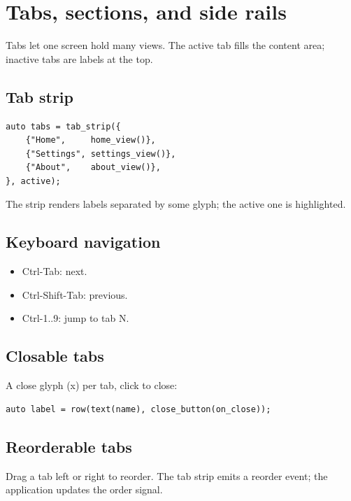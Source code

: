 \chapter{Tabs, sections, and side rails}
\label{ch:tabs}

\begin{aside}
Tabs let one screen hold many views. The active tab fills the
content area; inactive tabs are labels at the top.
\end{aside}

\section{Tab strip}

\begin{lstlisting}
auto tabs = tab_strip({
    {"Home",     home_view()},
    {"Settings", settings_view()},
    {"About",    about_view()},
}, active);
\end{lstlisting}

The strip renders labels separated by some glyph; the
active one is highlighted.

\section{Keyboard navigation}

\begin{itemize}[leftmargin=*]
  \item Ctrl-Tab: next.
  \item Ctrl-Shift-Tab: previous.
  \item Ctrl-1..9: jump to tab N.
\end{itemize}

\section{Closable tabs}

A close glyph (x) per tab, click to close:

\begin{lstlisting}
auto label = row(text(name), close_button(on_close));
\end{lstlisting}

\section{Reorderable tabs}

Drag a tab left or right to reorder. The tab strip emits a
reorder event; the application updates the order signal.

